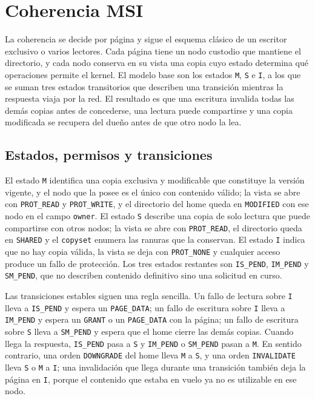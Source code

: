 \section{Coherencia MSI}\label{sec:msi}

La coherencia se decide por página y sigue el esquema clásico de un escritor exclusivo o varios lectores. Cada página tiene un nodo custodio que mantiene el directorio, y cada nodo conserva en su vista una copia cuyo estado determina qué operaciones permite el kernel. El modelo base son los estados \texttt{M}, \texttt{S} e \texttt{I}, a los que se suman tres estados transitorios que describen una transición mientras la respuesta viaja por la red. El resultado es que una escritura invalida todas las demás copias antes de concederse, una lectura puede compartirse y una copia modificada se recupera del dueño antes de que otro nodo la lea.

\subsection{Estados, permisos y transiciones}\label{sec:msi-estados}

El estado \texttt{M} identifica una copia exclusiva y modificable que constituye la versión vigente, y el nodo que la posee es el único con contenido válido; la vista se abre con \texttt{PROT\_READ} y \texttt{PROT\_WRITE}, y el directorio del home queda en \texttt{MODIFIED} con ese nodo en el campo \texttt{owner}. El estado \texttt{S} describe una copia de solo lectura que puede compartirse con otros nodos; la vista se abre con \texttt{PROT\_READ}, el directorio queda en \texttt{SHARED} y el \texttt{copyset} enumera las ranuras que la conservan. El estado \texttt{I} indica que no hay copia válida, la vista se deja con \texttt{PROT\_NONE} y cualquier acceso produce un fallo de protección. Los tres estados restantes son \texttt{IS\_PEND}, \texttt{IM\_PEND} y \texttt{SM\_PEND}, que no describen contenido definitivo sino una solicitud en curso.

Las transiciones estables siguen una regla sencilla. Un fallo de lectura sobre \texttt{I} lleva a \texttt{IS\_PEND} y espera un \texttt{PAGE\_DATA}; un fallo de escritura sobre \texttt{I} lleva a \texttt{IM\_PEND} y espera un \texttt{GRANT} o un \texttt{PAGE\_DATA} con la página; un fallo de escritura sobre \texttt{S} lleva a \texttt{SM\_PEND} y espera que el home cierre las demás copias. Cuando llega la respuesta, \texttt{IS\_PEND} pasa a \texttt{S} y \texttt{IM\_PEND} o \texttt{SM\_PEND} pasan a \texttt{M}. En sentido contrario, una orden \texttt{DOWNGRADE} del home lleva \texttt{M} a \texttt{S}, y una orden \texttt{INVALIDATE} lleva \texttt{S} o \texttt{M} a \texttt{I}; una invalidación que llega durante una transición también deja la página en \texttt{I}, porque el contenido que estaba en vuelo ya no es utilizable en ese nodo.

